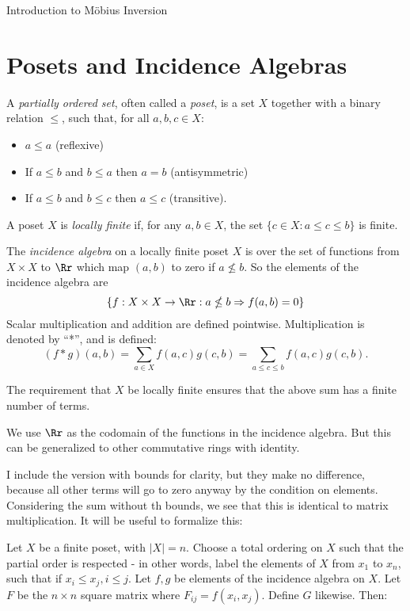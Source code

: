 \documentclass[12pt]{pom_thesis}
\begin{document}
\begin{chapter}{Introduction to M\"obius Inversion}
\section{Posets and Incidence Algebras}
\begin{defn}
A \emph{partially ordered set}, often called a \emph{poset}, is a set $X$ together with a binary relation $\leq$, such that, for all $a,b,c \in X$:
\begin{itemize}
\item $a \leq a$ (reflexive)
\item If $a \leq b$ and $b \leq a$ then $a = b$ (antisymmetric)
\item If $a \leq b$ and $b \leq c$ then $a \leq c$ (transitive).
\end{itemize}
\end{defn}
\begin{defn}
A poset $X$ is \emph{locally finite} if, for any $a,b \in X$, the set $\{c \in X : a \leq c \leq b\}$ is finite.
\end{defn}
\begin{defn}
The \emph{incidence algebra} on a locally finite poset $X$ is over the set of functions from $X \times X$ to $\Rr$ which map $(a,b)$ to zero if $a \nleq b$. So the elements of the incidence algebra are 
\[\{f:X \times X \rightarrow \Rr:a \nleq b \Rightarrow f(a,b) = 0\}
\]
Scalar multiplication and addition are defined pointwise.  Multiplication is denoted by ``*'', and is defined:
\[(f* g)(a,b) = \sum_{a \in X}f(a,c)g(c,b) = \sum_{a \leq c \leq b}f(a,c)g(c,b).\]
\end{defn}
\begin{rmk}
The requirement that $X$ be locally finite ensures that the above sum has a finite number of terms.
\end{rmk}
\begin{rmk}
We use $\Rr$ as the codomain of the functions in the incidence algebra. But this can be generalized to other commutative rings with identity.
\end{rmk}
I include the version with bounds for clarity, but they make no difference, because all other terms will go to zero anyway by the condition on elements. Considering the sum without th bounds, we see that this is identical to matrix multiplication. It will be useful to formalize this:
\begin{lemma}\label{mat_eq}
Let $X$ be a finite poset, with $|X|=n$. Choose a total ordering on $X$ such that the partial order is respected - in other words, label the elements of $X$ from $x_1$ to $x_n$, such that if $x_i \leq x_j, i \leq j$. Let $f,g$ be elements of the incidence algebra on $X$. Let $F$ be the $n\times n$ square matrix where $F_{ij}=f(x_i, x_j)$. Define $G$ likewise. Then:

\end{lemma}
\end{chapter}
\end{document}
